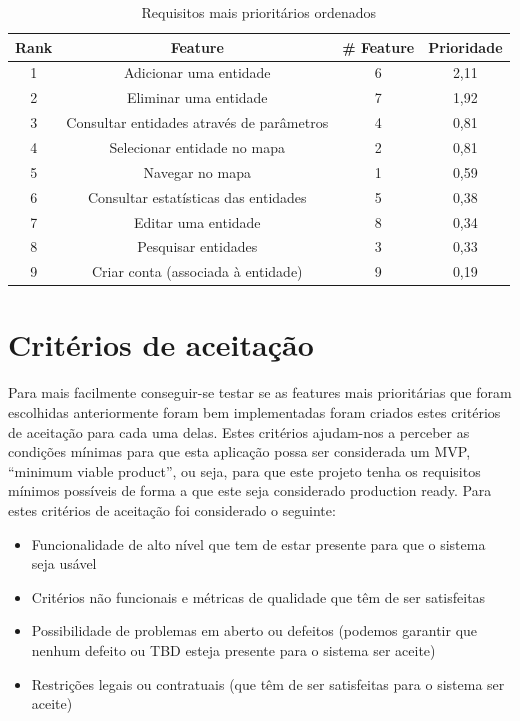 \documentclass{scrreprt}
\begin{document}
\begin{table}[H]
    \centering
    \begin{tabular}{|c|c|c|c|}
        \hline
        \rowcolor{blue!20!white}
        \textbf{Rank} & \textbf{Feature} & \textbf{\# Feature} & \textbf{Prioridade} \\
        \hline
        1 & Adicionar uma entidade & 6 & 2,11 \\
        \hline
        2 & Eliminar uma entidade & 7 & 1,92 \\
        \hline
        3 & Consultar entidades através de parâmetros & 4 & 0,81 \\
        \hline
        4 & Selecionar entidade no mapa & 2 & 0,81 \\
        \hline
        5 & Navegar no mapa & 1 & 0,59 \\
        \hline
        6 & Consultar estatísticas das entidades & 5 & 0,38 \\
        \hline
        7 & Editar uma entidade & 8 & 0,34 \\
        \hline
        8 & Pesquisar entidades & 3 & 0,33 \\
        \hline
        9 & Criar conta (associada à entidade) & 9 & 0,19 \\
        \hline
    \end{tabular}
    \caption{Requisitos mais prioritários ordenados}
    \label{table:requisitos ordenados}
\end{table}

\section{Critérios de aceitação}

Para mais facilmente conseguir-se testar se as features mais prioritárias que foram escolhidas anteriormente foram bem implementadas foram criados estes critérios de aceitação para cada uma delas. Estes critérios ajudam-nos a perceber as condições mínimas para que esta aplicação possa ser considerada um MVP, “minimum viable product”, ou seja, para que este projeto tenha os requisitos mínimos possíveis de forma a que este seja considerado production ready.
\newline
Para estes critérios de aceitação foi considerado o seguinte:

\begin{itemize}
    \item Funcionalidade de alto nível que tem de estar presente para que o sistema seja usável
    \item Critérios não funcionais e métricas de qualidade que têm de ser satisfeitas
    \item Possibilidade de problemas em aberto ou defeitos (podemos garantir que nenhum defeito ou TBD esteja presente para o sistema ser aceite)
    \item Restrições legais ou contratuais (que têm de ser satisfeitas para o sistema ser aceite)
\end{itemize}
\end{document}
